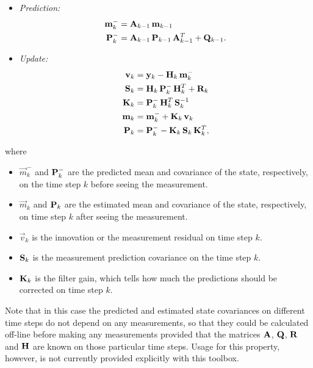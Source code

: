 \begin{itemize}
\item {\em Prediction:}
%
\begin{equation}
\begin{split}
  \mathbf{m}^-_{k} &= \mathbf{A}_{k-1} \, \mathbf{m}_{k-1} \\
  \mathbf{P}^-_{k} &= \mathbf{A}_{k-1} \, \mathbf{P}_{k-1} \, \mathbf{A}_{k-1}^T
                 + \mathbf{Q}_{k-1}.
\end{split}
\label{eq:dkf_predict}
\end{equation}
%
\item {\em Update:} 
%
\begin{equation}
\begin{split}
  \mathbf{v}_{k} &= \mathbf{y}_k - \mathbf{H}_{k} \, \mathbf{m}^-_{k} \\
  \mathbf{S}_{k} &= \mathbf{H}_{k} \, \mathbf{P}^-_{k} \, \mathbf{H}_{k}^T + \mathbf{R}_{k} \\
  \mathbf{K}_{k} &= \mathbf{P}^-_{k} \, \mathbf{H}^T_{k} \, \mathbf{S}^{-1}_{k} \\
  \mathbf{m}_{k} &= \mathbf{m}^-_{k} + \mathbf{K}_{k} \, \mathbf{v}_k \\
  \mathbf{P}_{k} &= \mathbf{P}^-_{k} - \mathbf{K}_{k} \, \mathbf{S}_{k} \, \mathbf{K}^T_{k}, \\
\end{split}
\label{eq:dkf_update}
\end{equation}
\end{itemize}
%
where
%
\begin{itemize}
%
\item $\vec{m}^-_{k}$ and $\mathbf{P}^-_{k}$ are the predicted mean and covariance of the state,
respectively,  on the time step $k$ before seeing the measurement.
%
\item $\vec{m}_{k}$ and $\mathbf{P}_{k}$ are the estimated mean and covariance of
the state, respectively, on time step $k$ after seeing the measurement.

\item $\vec{v}_k$ is the innovation or the measurement residual on time step $k$.
%
\item $\mathbf{S}_k$ is the measurement prediction covariance on the time step $k$.
%
\item $\mathbf{K}_k$ is the filter gain, which tells how much the predictions should be corrected on time step $k$.
%
\end{itemize}
%
Note that in this case the predicted and estimated state covariances on different time steps do not
depend on any measurements, so that they could be calculated off-line before making any measurements
provided that the matrices $\mathbf{A}$, $\mathbf{Q}$, $\mathbf{R}$ and $\mathbf{H}$ are known on those
particular time steps. Usage for this property, however, is not currently provided explicitly
with this toolbox.

